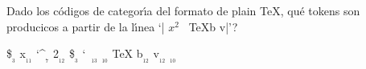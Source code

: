 

\bigskip

\enunciadoS Dado los c\'odigos de categor\'{\i}a del formato de plain
{\TeX}, qu\'e tokens son producicos a partir de la l\'{\i}nea `|
$x^2$~ \TeX ^^62 ^^6|'?

\bigskip

\respuestaS \$$_{_3}$ x$_{_{11}}$ \char`^$_{_7}$ 2$_{_{12}}$ \$$_{_3}$
\char`~$_{_{13}}$ \literalblanco$_{_{10}}$ TeX b$_{_{12}}$ v$_{_{12}}$
\literalblanco$_{_{10}}$

\bye

